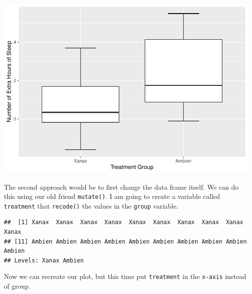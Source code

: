 \documentclass[
]{book}
\newenvironment{Shaded}{\begin{snugshade}}{\end{snugshade}}
\newcommand{\AttributeTok}[1]{\textcolor[rgb]{0.13,0.29,0.53}{#1}}
\newcommand{\CommentTok}[1]{\textcolor[rgb]{0.56,0.35,0.01}{\textit{#1}}}
\newcommand{\FunctionTok}[1]{\textcolor[rgb]{0.13,0.29,0.53}{\textbf{#1}}}
\newcommand{\NormalTok}[1]{#1}
\newcommand{\OtherTok}[1]{\textcolor[rgb]{0.56,0.35,0.01}{#1}}
\newcommand{\SpecialCharTok}[1]{\textcolor[rgb]{0.81,0.36,0.00}{\textbf{#1}}}
\newcommand{\StringTok}[1]{\textcolor[rgb]{0.31,0.60,0.02}{#1}}
\begin{document}
\includegraphics{rintro_demo_files/figure-latex/unnamed-chunk-284-1.pdf}

The second approach would be to first change the data frame itself. We can do this using our old friend \texttt{mutate()}. I am going to create a variable called \texttt{treatment} that \texttt{recode()} the values in the \texttt{group} variable.

\begin{Shaded}
\end{Shaded}

\begin{verbatim}
##  [1] Xanax  Xanax  Xanax  Xanax  Xanax  Xanax  Xanax  Xanax  Xanax  Xanax 
## [11] Ambien Ambien Ambien Ambien Ambien Ambien Ambien Ambien Ambien Ambien
## Levels: Xanax Ambien
\end{verbatim}

Now we can recreate our plot, but this time put \texttt{treatment} in the \texttt{x-axis} instead of group.
\end{document}
